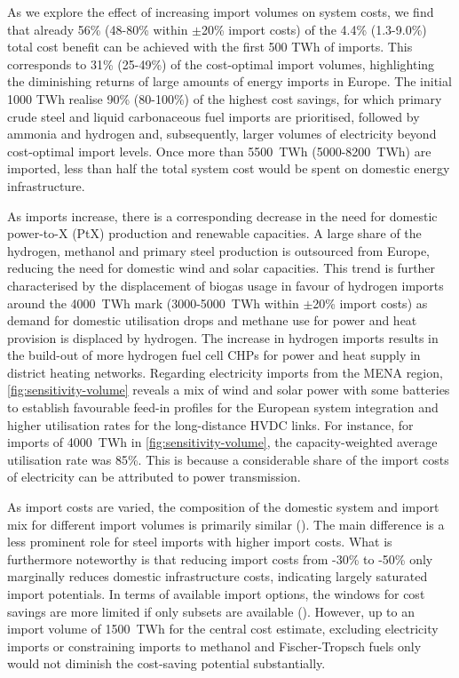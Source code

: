 As we explore the effect of increasing import volumes on system costs, we find
that already 56\% (48-80\% within $\pm$20\% import costs) of the 4.4\%
(1.3-9.0\%) total cost benefit can be achieved with the first 500 TWh of
imports. This corresponds to 31\% (25-49\%) of the cost-optimal import volumes,
highlighting the diminishing returns of large amounts of energy imports in
Europe. The initial 1000 TWh realise 90\% (80-100\%) of the highest cost
savings, for which primary crude steel and liquid carbonaceous fuel imports are
prioritised, followed by ammonia and hydrogen and, subsequently, larger volumes
of electricity beyond cost-optimal import levels. Once more than 5500~TWh
(5000-8200~TWh) are imported, less than half the total system cost would be
spent on domestic energy infrastructure.

As imports increase, there is a corresponding decrease in the need for domestic
power-to-X (PtX) production and renewable capacities. A large share of the
hydrogen, methanol and primary steel production is outsourced from Europe,
reducing the need for domestic wind and solar capacities. This trend is further
characterised by the displacement of biogas usage in favour of hydrogen imports
around the 4000~TWh mark (3000-5000~TWh within $\pm$20\% import costs) as demand
for domestic  utilisation drops and methane use for power and heat
provision is displaced by hydrogen. The increase in hydrogen imports results in
the build-out of more hydrogen fuel cell CHPs for power and heat supply in
district heating networks. Regarding electricity imports from the MENA region,
\cref{fig:sensitivity-volume} reveals a mix of wind and solar power with some
batteries to establish favourable feed-in profiles for the European system
integration and higher utilisation rates for the long-distance HVDC links. For
instance, for imports of 4000~TWh in \cref{fig:sensitivity-volume}, the
capacity-weighted average utilisation rate was 85\%. This is because a
considerable share of the import costs of electricity can be attributed to power
transmission.

As import costs are varied, the composition of the domestic system and import
mix for different import volumes is primarily similar
().
The main difference is a less prominent role for steel imports with higher
import costs. What is furthermore noteworthy is that reducing import costs from
-30\% to -50\% only marginally reduces domestic infrastructure costs, indicating
largely saturated import potentials. In terms of available import options, the
windows for cost savings are more limited if only subsets are available
(). However, up to an import volume of 1500~TWh
for the central cost estimate, excluding electricity imports or constraining
imports to methanol and Fischer-Tropsch fuels only would not diminish the
cost-saving potential substantially.

